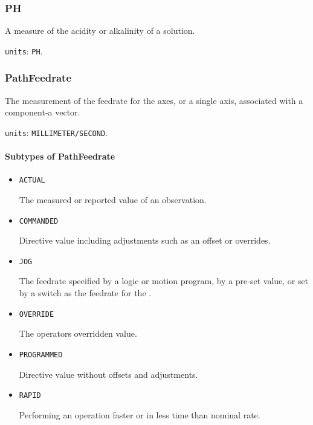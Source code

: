 \subsubsection{PH}
\label{sec:PH}



A measure of the acidity or alkalinity of a solution.


\texttt{units}: \texttt{PH}.


\subsubsection{PathFeedrate}
\label{sec:PathFeedrate}



The measurement of the feedrate for the axes, or a single axis, associated with a  component-a vector.


\texttt{units}: \texttt{MILLIMETER/SECOND}.

\paragraph{Subtypes of PathFeedrate}\mbox{}
\label{sec:Subtypes of PathFeedrate}

\begin{itemize}

\item \texttt{ACTUAL}


The measured or reported value of an \gls{observation}.

\item \texttt{COMMANDED}


Directive value including adjustments such as an offset or overrides.

\item \texttt{JOG}


The feedrate specified by a logic or motion program, by a pre-set value, or set by a switch as the feedrate for the . 

\item \texttt{OVERRIDE}


The operators overridden value.

\item \texttt{PROGRAMMED}


Directive value without offsets and adjustments.

\item \texttt{RAPID}


Performing an operation faster or in less time than nominal rate.


\end{itemize}









